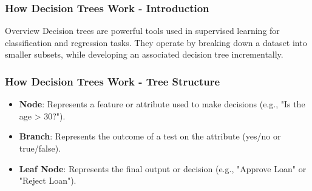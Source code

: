 \documentclass[aspectratio=169]{beamer}
\begin{document}
\begin{frame}[fragile]
    \frametitle{How Decision Trees Work - Introduction}
    \begin{block}{Overview}
        Decision trees are powerful tools used in supervised learning for classification and regression tasks. They operate by breaking down a dataset into smaller subsets, while developing an associated decision tree incrementally.
    \end{block}
\end{frame}

\begin{frame}[fragile]
    \frametitle{How Decision Trees Work - Tree Structure}
    \begin{itemize}
        \item \textbf{Node}: Represents a feature or attribute used to make decisions (e.g., "Is the age > 30?").
        \item \textbf{Branch}: Represents the outcome of a test on the attribute (yes/no or true/false).
        \item \textbf{Leaf Node}: Represents the final output or decision (e.g., "Approve Loan" or "Reject Loan").
    \end{itemize}
\end{frame}
\end{document}
